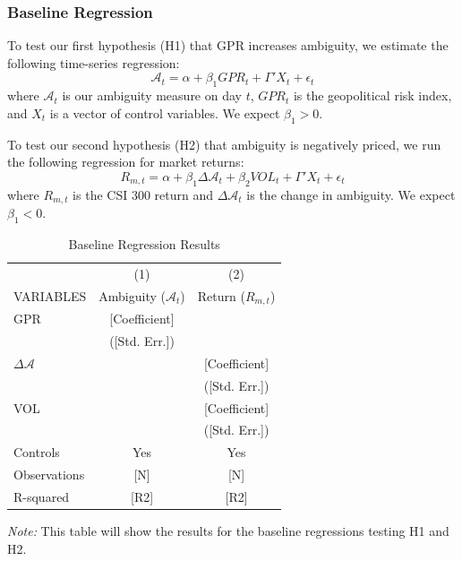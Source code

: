 \documentclass[preprint,12pt,authoryear]{elsarticle}
\begin{document}
\subsubsection{Baseline Regression}
To test our first hypothesis (H1) that GPR increases ambiguity, we estimate the following time-series regression:
\begin{equation}
\mathcal{A}_t = \alpha + \beta_1 GPR_t + \Gamma'X_t + \epsilon_t
\end{equation}
where $\mathcal{A}_t$ is our ambiguity measure on day $t$, $GPR_t$ is the geopolitical risk index, and $X_t$ is a vector of control variables. We expect $\beta_1 > 0$.

To test our second hypothesis (H2) that ambiguity is negatively priced, we run the following regression for market returns:
\begin{equation}
R_{m,t} = \alpha + \beta_1 \Delta\mathcal{A}_t + \beta_2 VOL_t + \Gamma'X_t + \epsilon_t
\end{equation}
where $R_{m,t}$ is the CSI 300 return and $\Delta\mathcal{A}_t$ is the change in ambiguity. We expect $\beta_1 < 0$.

\begin{table}[H]
\centering
\caption{Baseline Regression Results}
\label{tab:baseline_regs}
\begin{threeparttable}
\begin{tabular}{lcc}
\toprule
 & (1) & (2) \\
VARIABLES & Ambiguity ($\mathcal{A}_t$) & Return ($R_{m,t}$) \\
\midrule
GPR & [Coefficient] & \\
 & ([Std. Err.]) & \\
$\Delta\mathcal{A}$ & & [Coefficient] \\
 & & ([Std. Err.]) \\
VOL & & [Coefficient] \\
 & & ([Std. Err.]) \\
Controls & Yes & Yes \\
Observations & [N] & [N] \\
R-squared & [R2] & [R2] \\
\bottomrule
\end{tabular}
\begin{tablenotes}
\item \textit{Note:} This table will show the results for the baseline regressions testing H1 and H2.
\end{tablenotes}
\end{threeparttable}
\end{table}
\end{document}

